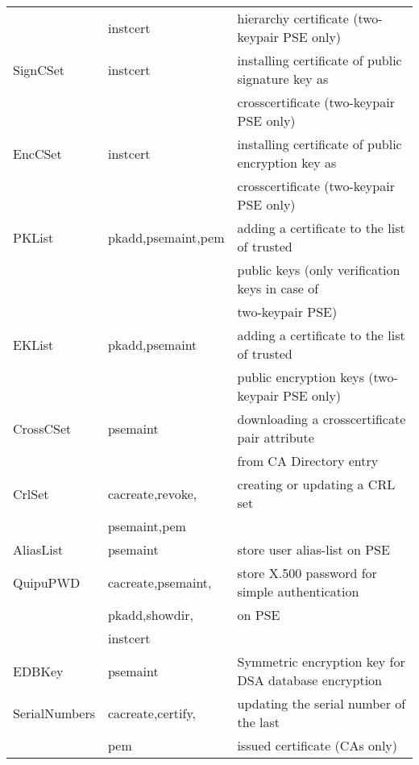 {\begin{tabular}{|l|l|l|}
             & instcert            & hierarchy certificate (two-keypair PSE only)        \\
SignCSet     & instcert            & installing certificate of public signature key as   \\
             &                     & crosscertificate (two-keypair PSE only)             \\
EncCSet      & instcert            & installing certificate of public encryption key as  \\
             &                     & crosscertificate (two-keypair PSE only)             \\
PKList       & pkadd,psemaint,pem  & adding a certificate to the list of trusted         \\
             &                     & public keys (only verification keys in case of      \\
             &                     &  two-keypair PSE)                                   \\
EKList       & pkadd,psemaint      & adding a certificate to the list of trusted         \\
             &                     & public encryption keys (two-keypair PSE only)       \\
CrossCSet    & psemaint            & downloading a crosscertificate pair attribute       \\
             &                     & from CA Directory entry                             \\
CrlSet       & cacreate,revoke,    & creating or updating a CRL set                      \\
             & psemaint,pem        &                                                     \\
AliasList    & psemaint            & store user alias-list on PSE                        \\
QuipuPWD     & cacreate,psemaint,  & store X.500 password for simple authentication      \\
             & pkadd,showdir,      & on PSE                                              \\
             & instcert            &                                                     \\
EDBKey       & psemaint            & Symmetric encryption key for DSA database encryption \\
SerialNumbers & cacreate,certify,  & updating the serial number of the last              \\
             & pem                 & issued certificate (CAs only)                       \\ \hline
\end{tabular}
}

